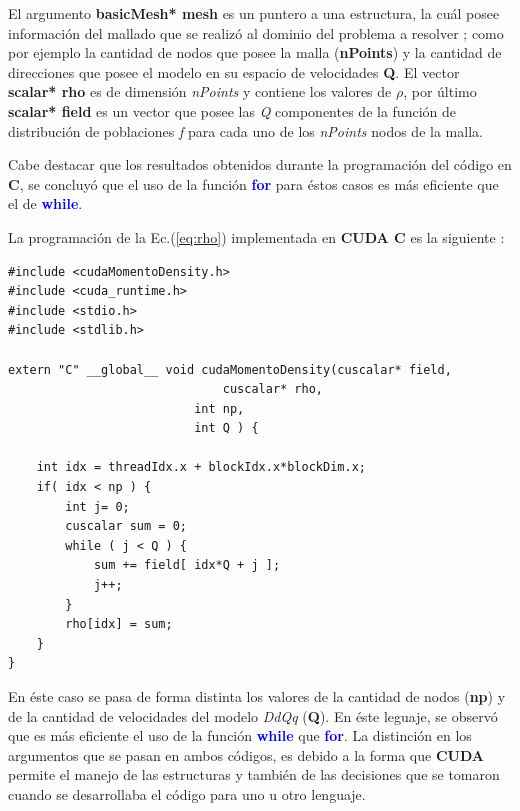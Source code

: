 El argumento \textbf{basicMesh* mesh} es un puntero a una estructura, la cuál posee información del mallado que se realizó al dominio del problema a resolver ; como por ejemplo la cantidad de nodos que posee la malla (\textbf{nPoints}) y la cantidad de direcciones que posee el modelo en su espacio de velocidades \textbf{Q}. El vector  \textbf{scalar* rho} es de dimensión \textit{nPoints} y contiene los valores de $\rho$, por último \textbf{scalar* field} es un vector que posee las \textit{Q} componentes de la función de distribución de poblaciones \textit{f} para cada uno de los  \textit{nPoints} nodos de la malla.

Cabe destacar que los resultados obtenidos durante la programación del código en \textbf{C}, se concluyó que el uso de la función \textcolor{blue}{\textbf{for}} para éstos casos es más eficiente que el de \textcolor{blue}{\textbf{while}}.

La programación de la Ec.(\ref{eq:rho}) implementada en \textbf{CUDA C} es la siguiente :
\newpage

{\footnotesize
	\begin{frame}{}
		\begin{lstlisting}[frame=single]
#include <cudaMomentoDensity.h>
#include <cuda_runtime.h>
#include <stdio.h>
#include <stdlib.h>

extern "C" __global__ void cudaMomentoDensity(cuscalar* field,
				              cuscalar* rho,
					      int np,
					      int Q ) {
							
	int idx = threadIdx.x + blockIdx.x*blockDim.x;	
	if( idx < np ) {	
		int j= 0;		
		cuscalar sum = 0;		
		while ( j < Q ) {		
			sum += field[ idx*Q + j ];			
			j++;			
		}				
		rho[idx] = sum;	
	}
}		
		\end{lstlisting}
		
	\end{frame}
}

En éste caso se pasa de forma distinta los valores de la cantidad de nodos (\textbf{np}) y de la cantidad de velocidades del modelo \textit{DdQq} (\textbf{Q}). En éste leguaje, se observó que es más eficiente el uso de la función \textcolor{blue}{\textbf{while}} que \textcolor{blue}{\textbf{for}}. La distinción en los argumentos que se pasan en ambos códigos, es debido a la forma que \textbf{CUDA} permite el manejo de las estructuras y también de las decisiones que se tomaron cuando se desarrollaba el código para uno u otro lenguaje.

